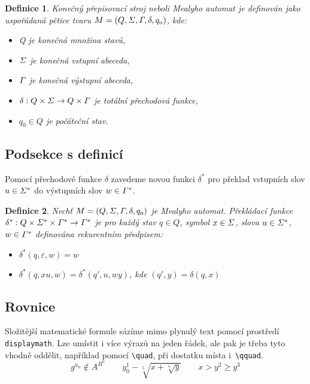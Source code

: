\documentclass[a4paper, twocolumn, 11pt]{article}
\newtheorem{definition}{Definice}
\begin{document}
\begin{definition}
    \label{definice1}\emph{Konečný přepisovací stroj} neboli \emph{Mealyho automat} je definován jako uspořádaná pětice tvaru $\mathnormal{M=(Q,\Sigma,\Gamma,\delta,q_0)}$, kde:

    \begin{itemize}
        \item Q je konečná množina \emph{stavů,}
        \item $\mathnormal{\Sigma}$ je konečná vstupní \emph{abeceda,}
        \item $\mathnormal{\Gamma}$ je konečná výstupní \emph{abeceda,}
        \item $\mathnormal{\delta:Q\times\Sigma\rightarrow Q\times\Gamma}$ je totální \emph{přechodová funkce,}
        \item $q_0\in Q$ je \emph{počáteční stav.}
    \end{itemize}
\end{definition}

\subsection{Podsekce s definicí}

Pomocí přechodové funkce $\delta$ zavedeme novou funkci $\delta^*$ pro překlad vstupních slov $\mathnormal{u\in\Sigma^*}$ do výstupních slov $\mathnormal{w\in\Gamma^*}$.

\begin{definition}
    Nechť $\mathnormal{M=(Q,\Sigma,\Gamma,\delta,q_0)}$ je Mealyho automat. \emph{Překládací funkce} $\mathnormal{\delta^*:Q\times\Sigma^*\times\Gamma^*\rightarrow\Gamma^*}$ je pro každý stav $q\in Q$, symbol $\mathnormal{x\in\Sigma}$, slova $\mathnormal{u\in\Sigma^*}$, $\mathnormal{w\in\Gamma^*}$ definována rekurentním předpisem:
    \begin{itemize}
        \item $\delta^*(q,\varepsilon,w)=w$
        \item $\delta^*(q,xu,w)=\delta^*(q',u,wy)$, kde $(q',y)=\delta(q,x)$
    \end{itemize}
\end{definition}

\subsection{Rovnice}

Složitější matematické formule sázíme mimo plynulý text pomocí prostředí \texttt{displaymath}. Lze umístit i více výrazů na jeden řádek, ale pak je třeba tyto vhodně oddělit, například pomocí \verb|\quad|, při dostatku místa i~\verb|\qquad|.
$$g^{a_n}\notin A^{B^n}\qquad y^1_0-\sqrt[5]{x+\sqrt[7]{y}}\qquad x>y^2\geq y^3$$
\end{document}
